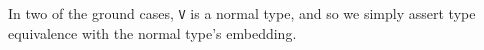 \documentclass[authoryear, acmsmall, screen, review, nonacm]{acmart}
\begin{document}
\begin{code}%
\>[0]\AgdaSpace{}%
\AgdaSpace{}%
\<%
\\
\>[0]\AgdaSpace{}%
\AgdaSymbol{:}\AgdaSpace{}%
\AgdaSpace{}%
\AgdaSymbol{\{}\AgdaSymbol{\}}\AgdaSpace{}%
\AgdaSpace{}%
\AgdaSpace{}%
\AgdaSpace{}%
\AgdaSpace{}%
\AgdaSpace{}%
\AgdaSpace{}%
\AgdaSpace{}%
\AgdaSpace{}%
\AgdaSpace{}%
\<%
\\
\>[0]\AgdaSpace{}%
\AgdaSymbol{:}\AgdaSpace{}%
\AgdaSpace{}%
\AgdaSpace{}%
\AgdaSymbol{(}\AgdaSpace{}%
\AgdaSpace{}%
\AgdaSymbol{)}\AgdaSpace{}%
\AgdaSpace{}%
\AgdaSpace{}%
\AgdaSpace{}%
\AgdaSpace{}%
\AgdaSpace{}%
\AgdaSpace{}%
\<%
\end{code}

In two of the ground cases, \verb!V! is a normal type, and so we simply assert type equivalence with the normal type's embedding.
\begin{code}%
\>[0]\AgdaSpace{}%
\AgdaSymbol{\{}\AgdaSpace{}%
\AgdaSymbol{=}\AgdaSpace{}%
\AgdaSymbol{\}}\AgdaSpace{}%
\AgdaSpace{}%
\AgdaSpace{}%
\AgdaSymbol{=}\AgdaSpace{}%
\AgdaSpace{}%
\AgdaSpace{}%
\AgdaSpace{}%
\<%
\\
\>[0]\AgdaSpace{}%
\AgdaSymbol{\{}\AgdaSpace{}%
\AgdaSymbol{=}\AgdaSpace{}%
\AgdaSymbol{\}}\AgdaSpace{}%
\AgdaSpace{}%
\AgdaSpace{}%
\AgdaSymbol{=}\AgdaSpace{}%
\AgdaSpace{}%
\AgdaSpace{}%
\AgdaSpace{}%
\<%
\end{code}
\end{document}
